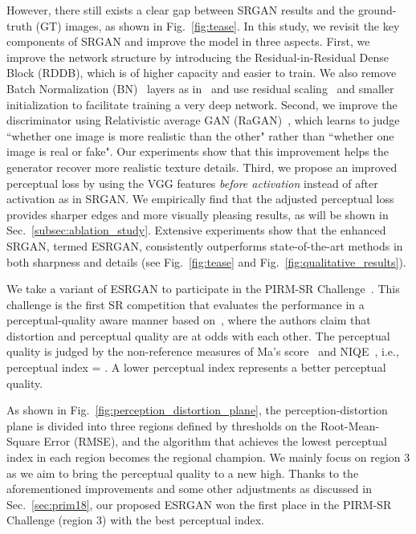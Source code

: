 \documentclass[runningheads]{llncs}
\begin{document}

However, there still exists a clear gap between SRGAN results and the ground-truth (GT) images, as shown in 
Fig.~\ref{fig:tease}. 
In this study, we revisit the key components of SRGAN and improve the model in three aspects.
First, we improve the network structure by introducing the Residual-in-Residual Dense Block (RDDB), which is of higher 
capacity and easier to train.
We also remove Batch Normalization (BN)~\cite{ioffe2015batch} layers as in~\cite{lim2017enhanced} and use residual 
scaling~\cite{szegedy2016inception,lim2017enhanced} and smaller initialization to facilitate training a very deep 
network. 
Second, we improve the discriminator using Relativistic average GAN (RaGAN)~\cite{jolicoeur2018relativistic}, which 
learns to judge ``whether one image is more realistic than the other" rather than ``whether one image is real or 
fake". 
Our experiments show that this improvement helps the generator recover more realistic texture details.
Third, we propose an improved perceptual loss by using the VGG features \textit{before activation} instead of after 
activation as in SRGAN.
We empirically find that the adjusted perceptual loss provides sharper edges and more visually pleasing results, as 
will be shown in Sec.~\ref{subsec:ablation_study}.
Extensive experiments show that the enhanced SRGAN, termed ESRGAN, consistently outperforms state-of-the-art methods in 
both sharpness and details (see Fig.~\ref{fig:tease} and Fig.~\ref{fig:qualitative_results}). 

We take a variant of ESRGAN to participate in the PIRM-SR Challenge~\cite{pirm18url}.
This challenge is the first SR competition that evaluates the performance in a perceptual-quality aware manner based 
on~\cite{blau2017perception}, where the authors claim that distortion and perceptual quality are at odds with each 
other. 
The perceptual quality is judged by the non-reference measures of Ma's score~\cite{ma2017learning} and 
NIQE~\cite{mittal2013making}, i.e., perceptual index = . 
A lower perceptual index represents a better perceptual quality.

As shown in Fig.~\ref{fig:perception_distortion_plane}, the perception-distortion plane is divided into three regions 
defined by thresholds on the Root-Mean-Square Error (RMSE), and the algorithm that achieves the lowest perceptual index 
in each region becomes the regional champion.
We mainly focus on region 3 as we aim to bring the perceptual quality to a new high. 
Thanks to the aforementioned improvements and some other adjustments as discussed in 
Sec.~\ref{sec:prim18}, our proposed ESRGAN won the first place in the PIRM-SR Challenge (region 3) with the best 
perceptual index.
\end{document}

